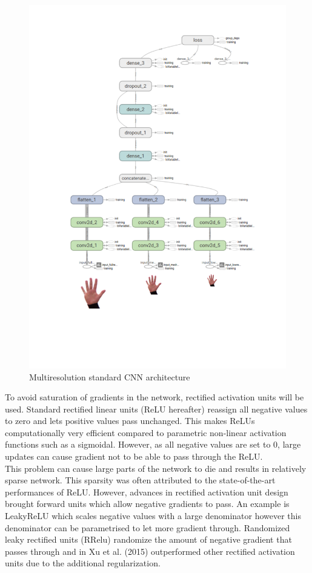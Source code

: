 \documentclass{article}
\begin{document}
\begin{figure}[h]
  \centering
  \includegraphics[scale=0.4]{tbgraph.pdf}
  \vspace*{-15mm}
  \caption{Multiresolution standard CNN architecture}
  \label{fig:multiinput}
\end{figure}

To avoid saturation of gradients in the network, rectified activation units will be used. Standard rectified linear units (ReLU hereafter) reassign all negative values to zero and lets positive values pass unchanged. This makes ReLUs computationally very efficient compared to parametric non-linear activation functions such as a sigmoidal. However, as all negative values are set to 0, large updates can cause gradient not to be able to pass through the ReLU.\\

This problem can cause large parts of the network to die and results in relatively sparse network. This sparsity was often attributed to the state-of-the-art performances of ReLU. However, advances in rectified activation unit design brought forward units which allow negative gradients to pass. An example is LeakyReLU which scales negative values with a large denominator however this denominator can be parametrised to let more gradient through. Randomized leaky rectified units (RRelu) randomize the amount of negative gradient that passes through and in Xu et al. (2015) outperformed other rectified activation units due to the additional regularization.\\
\end{document}
